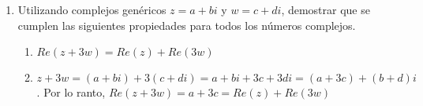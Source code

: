 \documentclass[a4paper]{article}
\newcommand{\answer}{\item[**]}
\newcommand{\exercise}{\item}
\newcommand{\df}[2]{\displaystyle\frac{#1}{#2}}
\newcommand{\cis}[1]{\left[\cos\left({#1}\right)+i\sin\left({#1}\right)\right]}
\begin{document}
\begin{enumerate}
\begin{multicols}{3}
\begin{enumerate} [label=(\alph*)]
		\item $-7$
		\answer $-7+0i=7\cis{\pi}=7e^{\pi i}$

		\item $\sqrt{6}\cis{\pi}$
		\answer $\sqrt{6}\cis{\pi}=\sqrt{6}e^{\pi i}=-\sqrt{6}+0i$

		\item $3e^{\frac{\pi}{4}i}$
		\answer $3e^{\frac{\pi}{4}i}=3\cis{\df{\pi}{4}}=\df{3\sqrt{2}}{2}+\df{3\sqrt{2}}{2}i$

		\item $4i$
		\answer $4i=4\cis{\df{\pi}{2}}=4e^{\df{\pi}{2}i}$

		\item $2\cis{\df{\pi}{4}}$
		\answer $2\cis{\df{\pi}{4}}=2e^{\frac{\pi}{4}i}=\sqrt{2}+\sqrt{2}i$

		\item $e^{\frac{\pi}{2}i}$
		\answer $e^{\frac{\pi}{2}i}=\cos\left(\df{\pi}{2}\right)+i\sin\left(\df{\pi}{2}\right)=0+i$

		\item $-2\sqrt{3}+2i$
		\answer $-2\sqrt{3}+2i=4\cis{\df{5\pi}{6}}=4e^{\frac{5\pi}{6}i}$

		\item $4\cis{0}$
		\answer $4\cis{0}=4e^{0}=4+0i$

		\item $2e^{-\frac{\pi}{3}i}$
		\answer $2e^{-\frac{\pi}{3}i}=2\cis{-\df{\pi}{3}}=1-\sqrt{3}i$

		\item $-1-i$
		\answer $-1-i=\sqrt{2}\cis{\df{\pi}{4}}=\sqrt{2}e^{\frac{\pi}{4}i}$

		\item $1\cis{\df{\pi}{12}}$
		\answer $\cos\left(\df{\pi}{12}\right)+i\sin\left(\df{\pi}{12}\right)=e^{\frac{\pi}{12}} \simeq 0.9659 + 0.2588 i$

		\item $4e^{\frac{3\pi}{2}i}$
		\answer $4e^{\frac{3\pi}{2}i}=4\cis{\df{3\pi}{2}}=0-4i$

	\end{enumerate}
	\end{multicols}

	\exercise Utilizando complejos genéricos $z=a+bi$ y $w=c+di$, demostrar que se cumplen las siguientes propiedades para todos los números complejos.
	\begin{multicols}{2}
	\begin{enumerate} [label=(\alph*)]
		\item $Re(z+3w)=Re(z)+Re(3w)$
		\answer $z+3w=(a+bi)+3(c+di)=a+bi+3c+3di=(a+3c)+(b+d)i$. Por lo ranto, $Re(z+3w)=a+3c=Re(z)+Re(3w)$


\end{enumerate}
\end{multicols}
\end{enumerate}
\end{document}
